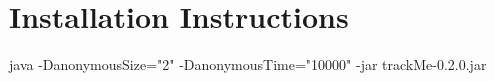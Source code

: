 \section{Installation Instructions} 

java -DanonymousSize="2" -DanonymousTime="10000" -jar trackMe-0.2.0.jar
